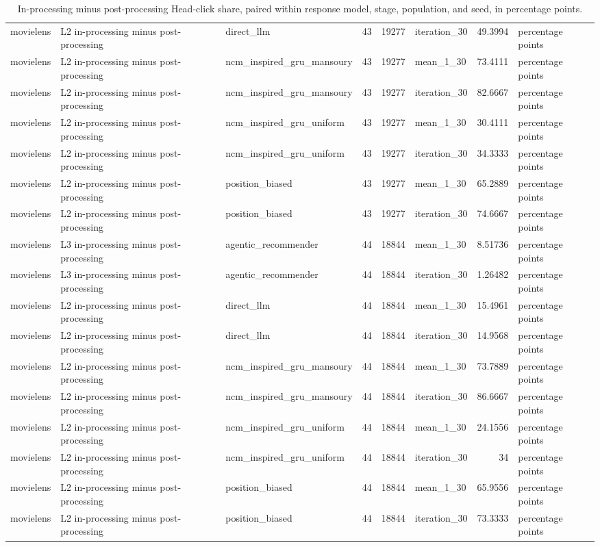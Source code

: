 \begin{table}[htbp!]
\begin{tabular}{lllrrlrl}
movielens & L2 in-processing minus post-processing & direct\_llm & 43 & 19277 & iteration\_30 & 49.3994 & percentage points \\
movielens & L2 in-processing minus post-processing & ncm\_inspired\_gru\_mansoury & 43 & 19277 & mean\_1\_30 & 73.4111 & percentage points \\
movielens & L2 in-processing minus post-processing & ncm\_inspired\_gru\_mansoury & 43 & 19277 & iteration\_30 & 82.6667 & percentage points \\
movielens & L2 in-processing minus post-processing & ncm\_inspired\_gru\_uniform & 43 & 19277 & mean\_1\_30 & 30.4111 & percentage points \\
movielens & L2 in-processing minus post-processing & ncm\_inspired\_gru\_uniform & 43 & 19277 & iteration\_30 & 34.3333 & percentage points \\
movielens & L2 in-processing minus post-processing & position\_biased & 43 & 19277 & mean\_1\_30 & 65.2889 & percentage points \\
movielens & L2 in-processing minus post-processing & position\_biased & 43 & 19277 & iteration\_30 & 74.6667 & percentage points \\
movielens & L3 in-processing minus post-processing & agentic\_recommender & 44 & 18844 & mean\_1\_30 & 8.51736 & percentage points \\
movielens & L3 in-processing minus post-processing & agentic\_recommender & 44 & 18844 & iteration\_30 & 1.26482 & percentage points \\
movielens & L2 in-processing minus post-processing & direct\_llm & 44 & 18844 & mean\_1\_30 & 15.4961 & percentage points \\
movielens & L2 in-processing minus post-processing & direct\_llm & 44 & 18844 & iteration\_30 & 14.9568 & percentage points \\
movielens & L2 in-processing minus post-processing & ncm\_inspired\_gru\_mansoury & 44 & 18844 & mean\_1\_30 & 73.7889 & percentage points \\
movielens & L2 in-processing minus post-processing & ncm\_inspired\_gru\_mansoury & 44 & 18844 & iteration\_30 & 86.6667 & percentage points \\
movielens & L2 in-processing minus post-processing & ncm\_inspired\_gru\_uniform & 44 & 18844 & mean\_1\_30 & 24.1556 & percentage points \\
movielens & L2 in-processing minus post-processing & ncm\_inspired\_gru\_uniform & 44 & 18844 & iteration\_30 & 34 & percentage points \\
movielens & L2 in-processing minus post-processing & position\_biased & 44 & 18844 & mean\_1\_30 & 65.9556 & percentage points \\
movielens & L2 in-processing minus post-processing & position\_biased & 44 & 18844 & iteration\_30 & 73.3333 & percentage points \\
\hline
\end{tabular}
\caption{In-processing minus post-processing Head-click share, paired within response model, stage, population, and seed, in percentage points.}
\label{chap:results:tab:rq4_method_comparison}
\end{table}
